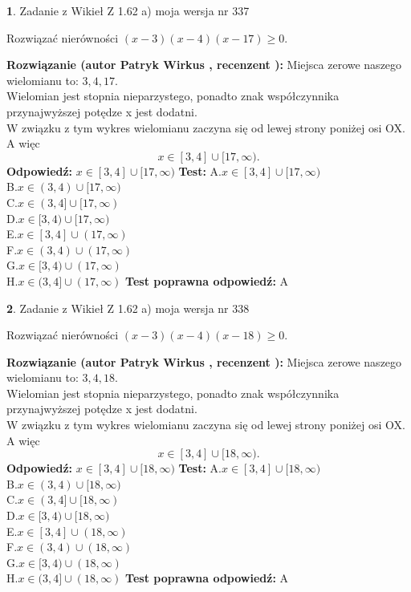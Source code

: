 \documentclass[12pt, a4paper]{article}
\theoremstyle{definition} %
\newtheorem{zad}{}
\newcommand{\zadStart}[1]{\begin{zad}#1\newline}
\newcommand{\zadStop}{\end{zad}}
\newcommand{\rozwStart}[2]{\noindent \textbf{Rozwiązanie (autor #1 , recenzent #2): }\newline}
\newcommand{\rozwStop}{\newline}
\newcommand{\odpStart}{\noindent \textbf{Odpowiedź:}\newline}
\newcommand{\odpStop}{\newline}
\newcommand{\testStart}{\noindent \textbf{Test:}\newline}
\newcommand{\testStop}{\newline}
\newcommand{\kluczStart}{\noindent \textbf{Test poprawna odpowiedź:}\newline}
\newcommand{\kluczStop}{\newline}
\begin{document}
\zadStart{Zadanie z Wikieł Z 1.62 a) moja wersja nr 337}

Rozwiązać nierówności $(x-3)(x-4)(x-17)\ge0$.
\zadStop
\rozwStart{Patryk Wirkus}{}
Miejsca zerowe naszego wielomianu to: $3, 4, 17$.\\
Wielomian jest stopnia nieparzystego, ponadto znak współczynnika przy\linebreak najwyższej potędze x jest dodatni.\\ W związku z tym wykres wielomianu zaczyna się od lewej strony poniżej osi OX. A więc $$x \in [3,4] \cup [17,\infty).$$
\rozwStop
\odpStart
$x \in [3,4] \cup [17,\infty)$
\odpStop
\testStart
A.$x \in [3,4] \cup [17,\infty)$\\
B.$x \in (3,4) \cup [17,\infty)$\\
C.$x \in (3,4] \cup [17,\infty)$\\
D.$x \in [3,4) \cup [17,\infty)$\\
E.$x \in [3,4] \cup (17,\infty)$\\
F.$x \in (3,4) \cup (17,\infty)$\\
G.$x \in [3,4) \cup (17,\infty)$\\
H.$x \in (3,4] \cup (17,\infty)$
\testStop
\kluczStart
A
\kluczStop



\zadStart{Zadanie z Wikieł Z 1.62 a) moja wersja nr 338}

Rozwiązać nierówności $(x-3)(x-4)(x-18)\ge0$.
\zadStop
\rozwStart{Patryk Wirkus}{}
Miejsca zerowe naszego wielomianu to: $3, 4, 18$.\\
Wielomian jest stopnia nieparzystego, ponadto znak współczynnika przy\linebreak najwyższej potędze x jest dodatni.\\ W związku z tym wykres wielomianu zaczyna się od lewej strony poniżej osi OX. A więc $$x \in [3,4] \cup [18,\infty).$$
\rozwStop
\odpStart
$x \in [3,4] \cup [18,\infty)$
\odpStop
\testStart
A.$x \in [3,4] \cup [18,\infty)$\\
B.$x \in (3,4) \cup [18,\infty)$\\
C.$x \in (3,4] \cup [18,\infty)$\\
D.$x \in [3,4) \cup [18,\infty)$\\
E.$x \in [3,4] \cup (18,\infty)$\\
F.$x \in (3,4) \cup (18,\infty)$\\
G.$x \in [3,4) \cup (18,\infty)$\\
H.$x \in (3,4] \cup (18,\infty)$
\testStop
\kluczStart
A
\kluczStop
\end{document}
